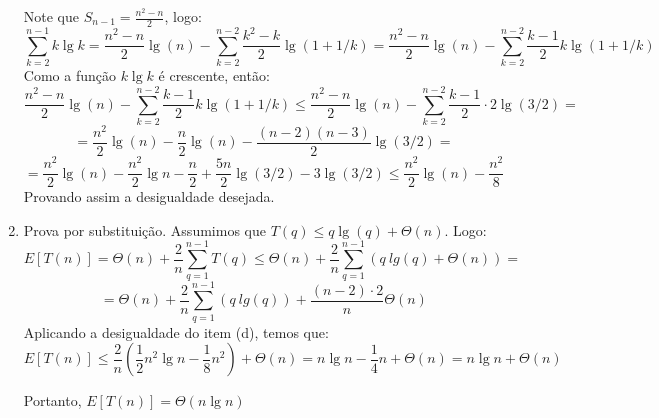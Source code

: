 \documentclass{article}
\begin{document}
\begin{enumerate}[label=(\alph*)]
    Note que $S_{n-1} = \frac{n^2 - n}{2}$, logo:
    $$\sum_{k=2}^{n-1} k \lg k =
    \frac{n^2 - n}{2}\lg(n)- \sum_{k=2}^{n-2}\frac{k^2 - k}{2}
    \lg (1+1/k) = 
    \frac{n^2 - n}{2}\lg(n)- \sum_{k=2}^{n-2}\frac{k-1}{2} k
    \lg (1+1/k)
    $$
    Como a função $k \lg k$ é crescente, então:
    $$
    \frac{n^2 - n}{2}\lg(n)- \sum_{k=2}^{n-2}\frac{k-1}{2} k
    \lg (1+1/k) \leq 
    \frac{n^2 - n}{2}\lg(n)- \sum_{k=2}^{n-2}\frac{k-1}{2} \cdot 2
    \lg (3/2) =
    $$
    $$
    =
    \frac{n^2}{2}\lg(n)-\frac{n}{2}\lg(n) -
    \frac{(n-2)(n-3)}{2}
    \lg (3/2) = 
    $$
    $$=
    \frac{n^2}{2}\lg(n)-\frac{n^2}{2}\lg n -
    \frac{n}{2} + \frac{5n}{2}\lg(3/2)-3\lg(3/2)
    \leq
    \frac{n^2}{2}\lg(n)-\frac{n^2}{8}
    $$
    Provando assim a desigualdade desejada.

    \item Prova por substituição. Assumimos que 
    $T(q)\leq q \lg(q) + \Theta(n)$. Logo:
    $$E[T(n)]=
    \Theta(n)+\frac{2}{n}
    \sum_{q=1}^{n-1}T(q) \leq
    \Theta(n)+\frac{2}{n}
    \sum_{q=1}^{n-1}(q \ lg(q)+\Theta(n)) =  
    $$
    $$
    = 
    \Theta(n)+\frac{2}{n}
    \sum_{q=1}^{n-1}(q \ lg(q))+\frac{(n-2)\cdot 2}{n}\Theta(n)
    $$
    Aplicando a desigualdade do item (d), temos que:
    $$
    E[T(n)]\leq 
    \frac{2}{n}
    (\frac{1}{2}n^2\lg n-\frac{1}{8}n^2)+\Theta(n) =
    n\lg n - \frac{1}{4}n + \Theta(n) = n\lg n + \Theta(n)
    $$

    Portanto, $E[T(n)] = \Theta(n\lg n)$



\end{enumerate}
\end{document}
